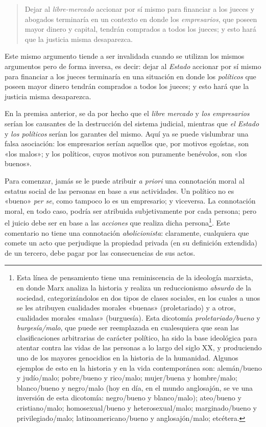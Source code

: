 \documentclass[12pt,a4paper,twoside]{book}
\begin{document}
\begin{quotation}
Dejar al \textit{libre-mercado} accionar por sí mismo para financiar a los jueces y abogados terminaría en un contexto en donde los \textit{empresarios}, que poseen mayor dinero y capital, tendrán comprados a todos los jueces; y esto hará que la justicia misma desaparezca.
\end{quotation}

Este mismo argumento tiende a ser invalidada cuando se utilizan los mismos argumentos pero de forma inversa, es decir: dejar al \textit{Estado} accionar por sí mismo para financiar a los jueces terminaría en una situación en donde los \textit{políticos} que poseen mayor dinero tendrán comprados a todos los jueces; y esto hará que la justicia misma desaparezca.

En la premisa anterior, se da por hecho que el \textit{libre mercado} y \textit{los empresarios} serían los causantes de la destrucción del sistema judicial, mientras que \textit{el Estado} y \textit{los políticos} serían los garantes del mismo. Aquí ya se puede vislumbrar una falsa asociación: los empresarios serían aquellos que, por motivos egoístas, son «los malos»; y los políticos, cuyos motivos son puramente benévolos, son «los buenos».

Para comenzar, jamás se le puede atribuir \textit{a priori} una connotación moral al estatus social de las personas en base a sus actividades. Un político no es «bueno» \textit{per se}, como tampoco lo es un empresario; y viceversa. La connotación moral, en todo caso, podría ser atribuida subjetivamente por cada persona; pero el juicio debe ser en base a las \textit{acciones} que realiza dicha persona\footnote{Esta línea de pensamiento tiene una reminiscencia de la ideología marxista, en donde Marx analiza la historia y realiza un reduccionismo \textit{absurdo} de la sociedad, categorizándolos en dos tipos de clases sociales, en los cuales a unos se les atribuyen cualidades morales «buenas» (proletariado) y a otros, cualidades morales «malas» (burguesía). Esta dicotomía \textit{proletariado/bueno} y \textit{burgesía/malo}, que puede ser reemplazada en cualesquiera que sean las clasificaciones arbitrarias de carácter político, ha sido la base ideológica para atentar contra las vidas de las personas a lo largo del siglo XX, y produciendo uno de los mayores genocidios en la historia de la humanidad. Algunos ejemplos de esto en la historia y en la vida contemporánea son: alemán/bueno y judío/malo; pobre/bueno y rico/malo; mujer/buena y hombre/malo; blanco/bueno y negro/malo (hoy en día, en el mundo anglosajón, se ve una inversión de esta dicotomía: negro/bueno y blanco/malo); ateo/bueno y cristiano/malo; homosexual/bueno y heterosexual/malo; marginado/bueno y privilegiado/malo; latinoamericano/bueno y anglosajón/malo; etcétera.}. Este comentario no tiene una connotación \textit{abolicionista}: claramente, cualquiera que comete un acto que perjudique la propiedad privada (en su definición extendida) de un tercero, debe pagar por las consecuencias de sus actos.
\end{document}
